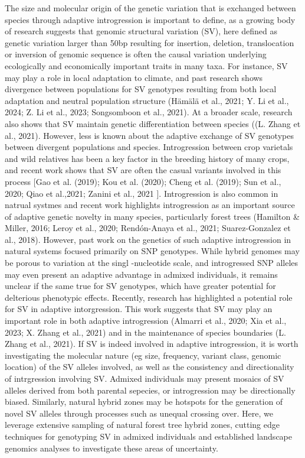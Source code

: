 \documentclass[
]{agujournal2019}
\begin{document}
The size and molecular origin of the genetic variation that is exchanged
between species through adaptive introgression is important to define,
as a growing body of research suggests that genomic structural variation
(SV), here defined as genetic variation larger than 50bp resulting for
insertion, deletion, translocation or inversion of genomic sequence is
often the causal variation underlying ecologically and economically
important traits in many taxa. For instance, SV may play a role in local
adaptation to climate, and past research shows divergence between
populations for SV genotypes resulting from both local adaptation and
neutral population structure (Hämälä et al., 2021; Y. Li et al., 2024;
Z. Li et al., 2023; Songsomboon et al., 2021). At a broader scale,
research also shows that SV maintain genetic differentiation between
species ((L. Zhang et al., 2021). However, less is known about the
adaptive exchange of SV genotypes between divergent populations and
species. Introgression between crop varietals and wild relatives has
been a key factor in the breeding history of many crops, and recent work
shows that SV are often the casual variants involved in this process
{[}Gao et al. (2019); Kou et al. (2020); Cheng et al. (2019); Sun et
al., 2020; Qiao et al.,2021; Zanini et al., 2021 {]}. Introgression is
also common in natrual systmes and recent work highlights introgression
as an important source of adaptive genetic novelty in many species,
particularly forest trees (Hamilton \& Miller, 2016; Leroy et al., 2020;
Rendón-Anaya et al., 2021; Suarez-Gonzalez et al., 2018). However, past
work on the genetics of such adaptive introgression in natural systems
focused primarily on SNP genotypes. While hybrid genomes may be porous
to variation at the singl -nucleotide scale, and introgressed SNP
alleles may even present an adaptive advantage in admixed individuals,
it remains unclear if the same true for SV genotypes, which have greater
potential for delterious phenotypic effects. Recently, research has
highlighted a potential role for SV in adaptive intorgression. This work
suggests that SV may play an important role in both adaptive
introgression (Almarri et al., 2020; Xia et al., 2023; X. Zhang et al.,
2021) and in the maintenance of species boundaries (L. Zhang et al.,
2021). If SV is indeed involved in adaptive introgression, it is worth
investigating the molecular nature (eg size, frequency, variant class,
genomic location) of the SV alleles involved, as well as the consistency
and directionality of intrgression involving SV. Admixed individuals may
present mosaics of SV alleles derived from both parental sepecies, or
introgression may be directionally biased. Similarly, natural hybrid
zones may be hotspots for the generation of novel SV alleles through
processes such as unequal crossing over. Here, we leverage extensive
sampling of natural forest tree hybrid zones, cutting edge techniques
for genotyping SV in admixed individuals and established landscape
genomics analyses to investigate these areas of uncertainty.
\end{document}
